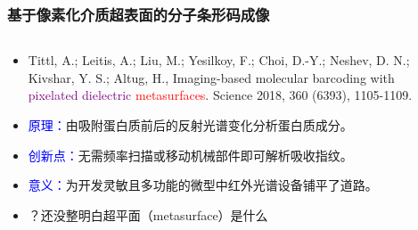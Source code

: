 \begin{frame}[c]
    \frametitle{基于像素化介质超表面的分子条形码成像}
    \begin{columns}
        \begin{column}{.7\textwidth}
            \begin{itemize}
                \item Tittl, A.;  Leitis, A.;  Liu, M.;  Yesilkoy, F.;  Choi, D.-Y.;  Neshev, D. N.;  Kivshar, Y. S.; Altug, H., Imaging-based molecular barcoding with \textcolor{purple}{pixelated dielectric} \textcolor{red}{metasurfaces}. Science 2018, 360 (6393), 1105-1109.
                \item \textcolor{blue}{原理：}由吸附蛋白质前后的反射光谱变化分析蛋白质成分。
                \item \textcolor{blue}{创新点：}无需频率扫描或移动机械部件即可解析吸收指纹。
                \item \textcolor{blue}{意义：}为开发灵敏且多功能的微型中红外光谱设备铺平了道路。
                \item ？还没整明白超平面（metasurface）是什么
            \end{itemize}
        \end{column}
        \begin{column}{.3\textwidth}
            \begin{figure}[H] %
                \centering %

\end{figure}
\end{column}
\end{columns}
\end{frame}
